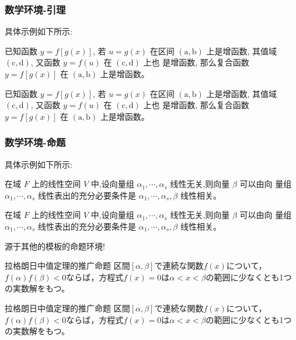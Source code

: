\subsubsection{数学环境-引理}
具体示例如下所示:
    \begin{lemma}[某某引理]
    已知函数 $y=f[g(x)]$, 若 $u=g(x)$ 在区间 $(\mathrm{a}, \mathrm{b})$ 上是增函数, 其值域 $(\mathrm{c}, \mathrm{d})$, 又函数 $y=f(u)$ 在 $(\mathrm{c}, \mathrm{d})$ 上也 是增函数, 那么复合函数 $y=f[g(x)]$ 在 $(\mathrm{a}, \mathrm{b})$ 上是增函数。
\end{lemma}
\begin{tcblisting}{}
    \begin{lemma}[某某引理]
已知函数 $y=f[g(x)]$, 若 $u=g(x)$ 在区间 $(\mathrm{a}, \mathrm{b})$ 上是增函数, 其值域 $(\mathrm{c}, \mathrm{d})$, 又函数 $y=f(u)$ 在 $(\mathrm{c}, \mathrm{d})$ 上也 是增函数, 那么复合函数 $y=f[g(x)]$ 在 $(\mathrm{a}, \mathrm{b})$ 上是增函数。
    \end{lemma}
\end{tcblisting}


\subsubsection{数学环境-命题}
具体示例如下所示:
\begin{proposition}
    在域 $F$ 上的线性空间 $V$ 中,设向量组 $\alpha_{1}, \cdots, \alpha_{s}$ 线性无关,则向量 $\beta$ 可以由向 量组 $\alpha_{1}, \cdots, \alpha_{s}$ 线性表出的充分必要条件是 $\alpha_{1}, \cdots, \alpha_{s}, \beta$ 线性相关。
\end{proposition}

\begin{tcblisting}{}
\begin{proposition}
    在域 $F$ 上的线性空间 $V$ 中,设向量组 $\alpha_{1}, \cdots, \alpha_{s}$ 线性无关,则向量 $\beta$ 可以由向 量组 $\alpha_{1}, \cdots, \alpha_{s}$ 线性表出的充分必要条件是 $\alpha_{1}, \cdots, \alpha_{s}, \beta$ 线性相关。
\end{proposition}
\end{tcblisting}

源于其他的模板的命题环境!
\begin{myprop}{拉格朗日中值定理的推广命题}{}
    区間$[\alpha,\beta]$で連続な関数$f(x)$について，
    $f(\alpha)f(\beta)<0$ならば，方程式$f(x)=0$は$\alpha<x<\beta$の範囲に少なくとも1つの実数解をもつ。
\end{myprop}
\begin{tcblisting}{}
\begin{myprop}{拉格朗日中值定理的推广命题}{}
    区間$[\alpha,\beta]$で連続な関数$f(x)$について，
    $f(\alpha)f(\beta)<0$ならば，方程式$f(x)=0$は$\alpha<x<\beta$の範囲に少なくとも1つの実数解をもつ。
\end{myprop}
\end{tcblisting}


